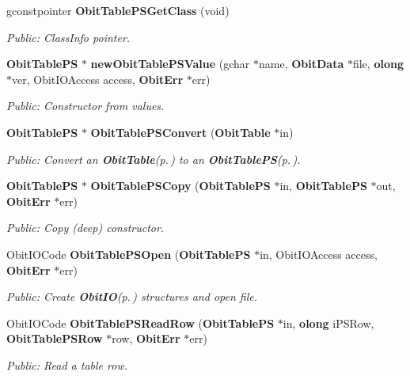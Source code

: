 \begin{CompactItemize}
gconstpointer {\bf Obit\-Table\-PSGet\-Class} (void)
\begin{CompactList}\small\item\em Public: Class\-Info pointer. \item\end{CompactList}\item 
{\bf Obit\-Table\-PS} $\ast$ {\bf new\-Obit\-Table\-PSValue} (gchar $\ast$name, {\bf Obit\-Data} $\ast$file, {\bf olong} $\ast$ver, Obit\-IOAccess access, {\bf Obit\-Err} $\ast$err)
\begin{CompactList}\small\item\em Public: Constructor from values. \item\end{CompactList}\item 
{\bf Obit\-Table\-PS} $\ast$ {\bf Obit\-Table\-PSConvert} ({\bf Obit\-Table} $\ast$in)
\begin{CompactList}\small\item\em Public: Convert an {\bf Obit\-Table}{\rm (p.\,\pageref{structObitTable})} to an {\bf Obit\-Table\-PS}{\rm (p.\,\pageref{structObitTablePS})}. \item\end{CompactList}\item 
{\bf Obit\-Table\-PS} $\ast$ {\bf Obit\-Table\-PSCopy} ({\bf Obit\-Table\-PS} $\ast$in, {\bf Obit\-Table\-PS} $\ast$out, {\bf Obit\-Err} $\ast$err)
\begin{CompactList}\small\item\em Public: Copy (deep) constructor. \item\end{CompactList}\item 
Obit\-IOCode {\bf Obit\-Table\-PSOpen} ({\bf Obit\-Table\-PS} $\ast$in, Obit\-IOAccess access, {\bf Obit\-Err} $\ast$err)
\begin{CompactList}\small\item\em Public: Create {\bf Obit\-IO}{\rm (p.\,\pageref{structObitIO})} structures and open file. \item\end{CompactList}\item 
Obit\-IOCode {\bf Obit\-Table\-PSRead\-Row} ({\bf Obit\-Table\-PS} $\ast$in, {\bf olong} i\-PSRow, {\bf Obit\-Table\-PSRow} $\ast$row, {\bf Obit\-Err} $\ast$err)
\begin{CompactList}\small\item\em Public: Read a table row. \item\end{CompactList}\item 

\end{CompactItemize}

